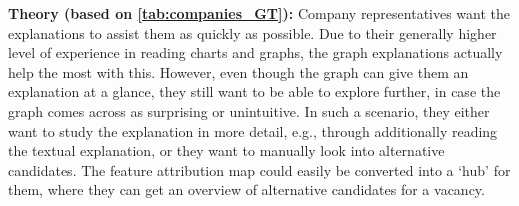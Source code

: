 \noindent \textbf{Theory (based on \cref{tab:companies_GT}):} Company representatives want the explanations to assist them as quickly as possible. Due to their generally higher level of experience in reading charts and graphs, the graph explanations actually help the most with this. However, even though the graph can give them an explanation at a glance, they still want to be able to explore further, in case the graph comes across as surprising or unintuitive. In such a scenario, they either want to study the explanation in more detail, e.g., through additionally reading the textual explanation, or they want to manually look into alternative candidates. The feature attribution map could easily be converted into a `hub' for them, where they can get an overview of alternative candidates for a vacancy.
